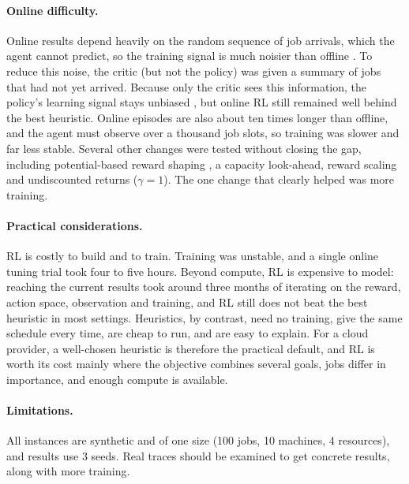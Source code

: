 \documentclass[12pt]{article}
\begin{document}
\paragraph{Online difficulty.} Online results depend heavily on the random sequence of job arrivals, which the agent cannot predict, so the training signal is much noisier than offline \cite{mao2019variance}. To reduce this noise, the critic (but not the policy) was given a summary of jobs that had not yet arrived. Because only the critic sees this information, the policy's learning signal stays unbiased \cite{mao2019variance, pinto2018asymmetric}, but online RL still remained well behind the best heuristic. Online episodes are also about ten times longer than offline, and the agent must observe over a thousand job slots, so training was slower and far less stable. Several other changes were tested without closing the gap, including potential-based reward shaping \cite{ng1999shaping}, a capacity look-ahead, reward scaling and undiscounted returns ($\gamma = 1$). The one change that clearly helped was more training.

\paragraph{Practical considerations.} RL is costly to build and to train. Training was unstable, and a single online tuning trial took four to five hours. Beyond compute, RL is expensive to model: reaching the current results took around three months of iterating on the reward, action space, observation and training, and RL still does not beat the best heuristic in most settings. Heuristics, by contrast, need no training, give the same schedule every time, are cheap to run, and are easy to explain. For a cloud provider, a well-chosen heuristic is therefore the practical default, and RL is worth its cost mainly where the objective combines several goals, jobs differ in importance, and enough compute is available.

\paragraph{Limitations.} All instances are synthetic and of one size (100 jobs, 10 machines, 4 resources), and results use 3 seeds. Real traces should be examined to get concrete results, along with more training.
\end{document}

